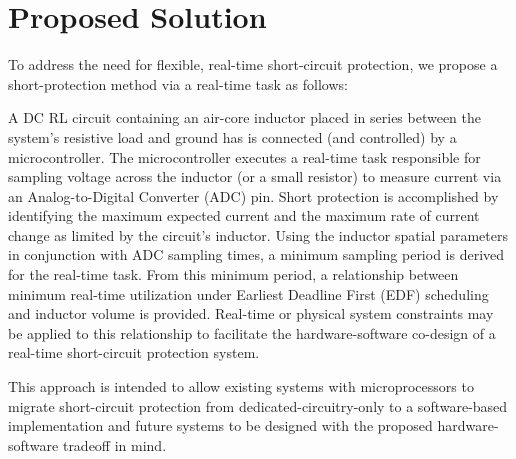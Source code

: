 \documentclass[11pt,oneside]{report}
\begin{document}
    \section{Proposed Solution}
    To address the need for flexible, real-time short-circuit protection, we propose a short-protection method via a real-time task as follows:
    
    A DC RL circuit containing an air-core inductor placed in series between the system's resistive load and ground has is connected (and controlled) by a microcontroller. The microcontroller executes a real-time task responsible for sampling voltage across the inductor (or a small resistor) to measure current via an Analog-to-Digital Converter (ADC) pin. Short protection is accomplished by identifying the maximum expected current and the maximum rate of current change as limited by the circuit's inductor. Using the inductor spatial parameters in conjunction with ADC sampling times, a minimum sampling period is derived for the real-time task. From this minimum period, a relationship between minimum real-time utilization under Earliest Deadline First (EDF) scheduling and inductor volume  is provided. Real-time or physical system constraints may be applied to this relationship to facilitate the hardware-software co-design of a real-time short-circuit protection system.
    
    This approach is intended to allow existing systems with microprocessors to migrate short-circuit protection from dedicated-circuitry-only to a software-based implementation and future systems to be designed with the proposed hardware-software tradeoff in mind.
    
\end{document}
